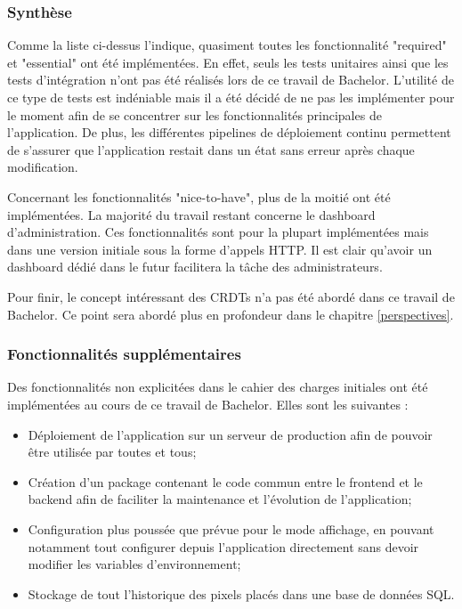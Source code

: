 \subsubsection{Synthèse}

Comme la liste ci-dessus l'indique, quasiment toutes les fonctionnalité "required" et "essential" ont été implémentées. En effet, seuls les tests unitaires ainsi que les tests d'intégration n'ont pas été réalisés lors de ce travail de Bachelor. L'utilité de ce type de tests est indéniable mais il a été décidé de ne pas les implémenter pour le moment afin de se concentrer sur les fonctionnalités principales de l'application. De plus, les différentes pipelines de déploiement continu permettent de s'assurer que l'application restait dans un état sans erreur après chaque modification.

Concernant les fonctionnalités "nice-to-have", plus de la moitié ont été implémentées. La majorité du travail restant concerne le dashboard d'administration. Ces fonctionnalités sont pour la plupart implémentées mais dans une version initiale sous la forme d'appels HTTP. Il est clair qu'avoir un dashboard dédié dans le futur facilitera la tâche des administrateurs.

Pour finir, le concept intéressant des CRDTs n'a pas été abordé dans ce travail de Bachelor. Ce point sera abordé plus en profondeur dans le chapitre \ref{perspectives}.

\subsubsection{Fonctionnalités supplémentaires}

Des fonctionnalités non explicitées dans le cahier des charges initiales ont été implémentées au cours de ce travail de Bachelor. Elles sont les suivantes :


\begin{itemize}
  \item Déploiement de l'application sur un serveur de production afin de pouvoir être utilisée par toutes et tous;
  \item Création d'un package contenant le code commun entre le frontend et le backend afin de faciliter la maintenance et l'évolution de l'application;
  \item Configuration plus poussée que prévue pour le mode affichage, en pouvant notamment tout configurer depuis l'application directement sans devoir modifier les variables d'environnement;
  \item Stockage de tout l'historique des pixels placés dans une base de données SQL.
\end{itemize}

